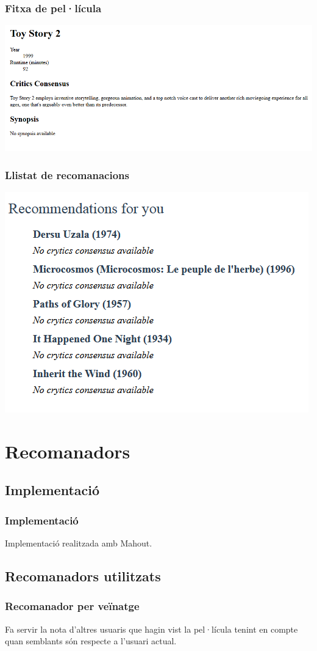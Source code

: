\documentclass[catalan]{beamer}
\begin{document}
\begin{frame}
\frametitle{Fitxa de pel·lícula}
\begin{center}
\includegraphics[width=\textwidth]{figs/film}
\end{center}
\end{frame}

\begin{frame}
\frametitle{Llistat de recomanacions}
\begin{center}
\includegraphics[width=.6\textwidth]{figs/recommendation}
\end{center}
\end{frame}


\section{Recomanadors}

\subsection{Implementació}
\begin{frame}
\frametitle{Implementació}
Implementació realitzada amb Mahout.
\end{frame}

\subsection{Recomanadors utilitzats}
\begin{frame}
\frametitle{Recomanador per veïnatge}
Fa servir la nota d'altres usuaris que hagin vist la pel·lícula tenint en compte quan semblants són respecte a l'usuari actual.
\end{frame}
\end{document}
